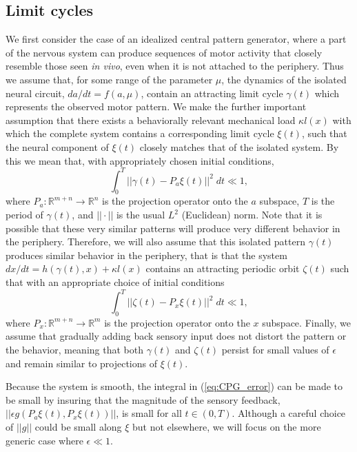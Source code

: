 \subsection{Limit cycles}

We first consider the case of an idealized central pattern generator, where a
part of the nervous system can produce sequences of motor activity that closely
resemble those seen \textit{in vivo}, even when it is not attached to the
periphery.  Thus we assume that, for some range of the parameter $\mu$,
the dynamics of the isolated neural circuit,
$da/dt = f(a, \mu)$, contain an attracting limit cycle $\gamma(t)$ which
represents the observed motor pattern.  We make the further important
assumption that there exists a behaviorally relevant mechanical load
$\kappa l(x)$ with which the complete system contains a corresponding limit
cycle $\xi(t)$, such that the neural component of $\xi(t)$ closely matches that
of the isolated system.  By this we mean that, with appropriately chosen
initial conditions,
\begin{equation}
    \int_0^T ||\gamma(t) - P_a \xi(t)||^2\;dt \ll 1,
    \label{eq:CPG_error}
\end{equation}
where $P_a : \mathbb{R}^{m+n} \to \mathbb{R}^n$ is the projection operator onto
the $a$ subspace, $T$ is the period of $\gamma(t)$, and $||\cdot||$ is the
usual $L^2$ (Euclidean) norm.  Note that it is possible that these very similar
patterns will produce very different behavior in the periphery.  Therefore, we
will also assume that this isolated pattern
$\gamma(t)$ produces similar behavior in the periphery, that is that the system
$dx/dt = h(\gamma(t), x) + \kappa l(x)$ contains an attracting periodic orbit
$\zeta(t)$ such that with an appropriate choice of initial conditions
\begin{equation}
    \int_0^T ||\zeta(t) - P_x \xi(t)||^2\;dt \ll 1,
    \label{eq:CPG_periph_error}
\end{equation}
where $P_x : \mathbb{R}^{m+n} \to \mathbb{R}^m$ is the projection operator onto
the $x$ subspace.  Finally, we assume that gradually adding back sensory input
does not distort the pattern or the behavior, meaning that both $\gamma(t)$ and
$\zeta(t)$ persist for small values of $\epsilon$ and remain similar to
projections of $\xi(t)$.

Because the system is smooth, the integral in (\ref{eq:CPG_error})
can be made to be small by insuring that the magnitude of the sensory feedback,
$||\epsilon g(P_a \xi(t), P_x \xi(t))||$, is small for all $t \in (0,
T)$.  Although a careful
choice of $||g||$ could be small along $\xi$ but not elsewhere, we will focus
on the more generic case where $\epsilon \ll 1$.

